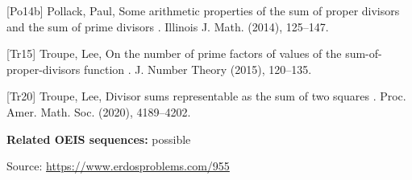\documentclass{article}
\begin{document}
[Po14b] Pollack, Paul, Some arithmetic properties of the sum of proper divisors and the sum of prime divisors . Illinois J. Math. (2014), 125--147.

[Tr15] Troupe, Lee, On the number of prime factors of values of the sum-of-proper-divisors function . J. Number Theory (2015), 120--135.

[Tr20] Troupe, Lee, Divisor sums representable as the sum of two squares . Proc. Amer. Math. Soc. (2020), 4189--4202.

\noindent\textbf{Related OEIS sequences:} possible


\bigskip
\noindent\small{Source: \url{https://www.erdosproblems.com/955}}
\end{document}
